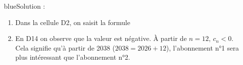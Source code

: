 \documentclass[10pt]{article}
\begin{document}
\begin{color}{blue}Solution :\par
\begin{enumerate}
\item Dans la cellule {\helvbx D2}, on saisit la formule 
\item En {\helvbx D14} on observe que la valeur est négative. À partir de $n=12$, $c_{n} <0$. Cela signifie qu'à partir de 2038 ($2038=2026+12$), l'abonnement n°1 sera plus intéressant que l'abonnement n°2.
\end{enumerate}
\end{color}
\end{document}
